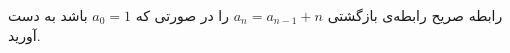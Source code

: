     \p
    رابطه صریح ‌رابطه‌ی بازگشتی 
    $a_n=a_{n-1}+n$
    را در صورتی که
    $a_0=1$
    باشد به دست آورید.